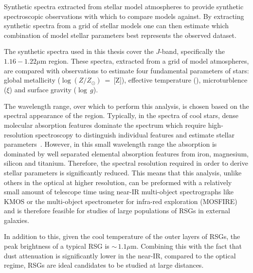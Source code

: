 Synthetic spectra extracted from stellar model atmospheres to provide synthetic spectroscopic observations with which to compare models against.
By extracting synthetic spectra from a grid of stellar models one can then estimate which combination of model stellar parameters best represents the observed dataset.

The synthetic spectra used in this thesis cover the $J$-band, specifically the $1.16-1.22\mu$m region.
These spectra, extracted from a grid of model atmospheres, are compared with observations to estimate four fundamental parameters of stars:
global metallicity ($\log (Z/Z_{\odot})$~=~[Z]), effective temperature (\Teff), microturblence ($\xi$) and surface gravity ($\log\,g$).


The wavelength range, over which to perform this analysis,
is chosen based on the spectral appearance of the region.
Typically, in the spectra of cool stars, dense molecular absorption features dominate the spectrum which require high-resolution spectroscopy to distinguish individual features and estimate stellar parameters~\citep{Cunha07, Davies09a, Davies09b}.
However, in this small wavelength range the absorption is dominated by well separated elemental absorption features from iron, magnesium, silicon and titanium.
Therefore, the spectral resolution required in order to derive stellar parameters is significantly reduced.
This means that this analysis, unlike others in the optical at higher resolution, can be preformed with a relatively small amount of telescope time using near-IR multi-object spectrographs like KMOS
or the multi-object spectrometer for infra-red exploration (MOSFIRE) and is therefore feasible for studies of large populations of RSGs in external galaxies.

In addition to this, given the cool temperature of the outer layers of RSGs,
the peak brightness of a typical RSG is $\sim\,1.1\mu$m.
Combining this with the fact that dust attenuation is significantly lower in the near-IR, compared to the optical regime, RSGs are ideal candidates to be studied at large distances.

